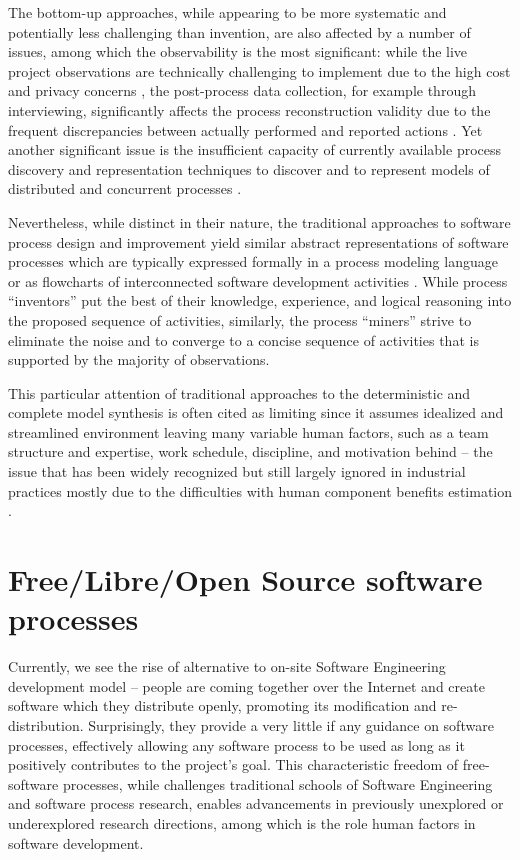 The bottom-up approaches, while appearing to be more systematic and potentially less challenging than invention, 
are also affected by a number of issues, among which the observability is the most significant: 
while the live project observations are technically challenging to implement due to the high cost and 
privacy concerns \cite{citeulike:12944447}, the post-process data collection, for example through interviewing, 
significantly affects the process reconstruction validity due to the frequent discrepancies between actually 
performed and reported actions \cite{citeulike:7691059}. 
Yet another significant issue is the insufficient capacity of currently available process discovery and 
representation techniques to discover and to represent models of distributed and concurrent processes 
\cite{citeulike:12944447}. 

Nevertheless, while distinct in their nature, the traditional approaches to software process design and 
improvement yield similar abstract representations of software processes which are typically expressed 
formally in a process modeling language or as flowcharts of interconnected software 
development activities \cite{citeulike:12944447} \cite{citeulike:12944456}.
While process ``inventors'' put the best of their knowledge, experience, and logical reasoning into the proposed 
sequence of activities, similarly, the process ``miners'' strive to eliminate the noise and to converge to a 
concise sequence of activities that is supported by the majority of observations. 

This particular attention of traditional approaches to the deterministic and complete model synthesis 
is often cited as limiting since it assumes idealized and streamlined environment leaving many variable 
human factors, such as a team structure and expertise, work schedule, discipline, and motivation behind 
-- the issue that has been widely recognized 
\cite{citeulike:149387} \cite{citeulike:113403} \cite{citeulike:205322} \cite{citeulike:12798652}
but still largely ignored in industrial practices mostly due to the  difficulties with human component 
benefits estimation \cite{citeulike:12798659} \cite{citeulike:12798662} \cite{csdl2-12-11}.

%
%
\section{Free/Libre/Open Source software processes}
Currently, we see the rise of alternative to on-site Software Engineering development model -- 
people are coming together over the Internet and create software which they distribute 
openly, promoting its modification and re-distribution. 
Surprisingly, they provide a very little if any guidance on software processes, effectively allowing any 
software process to be used as long as it positively contributes to the project's goal. 
This characteristic freedom of free-software processes, while challenges traditional schools of 
Software Engineering and software process research, enables advancements in previously unexplored or 
underexplored research directions, among which is the role human factors in software development.

